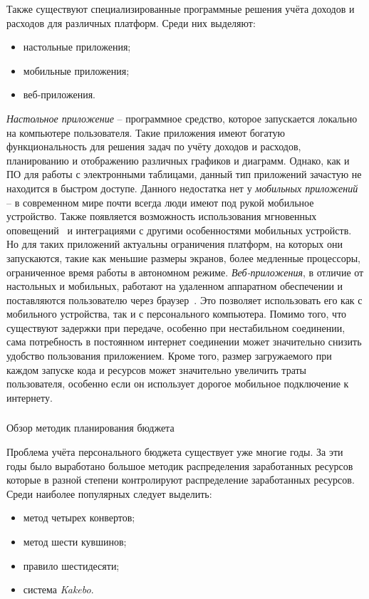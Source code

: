 Также существуют специализированные программные решения учёта доходов и расходов для различных платформ.
Среди них выделяют:
\begin{itemize}
    \item настольные приложения;
    \item мобильные приложения;
    \item веб-приложения.
\end{itemize}

\emph{Настольное приложение} -- программное средство, которое запускается локально на компьютере пользователя.
Такие приложения имеют богатую функциональность для решения задач по учёту доходов и расходов, планированию и отображению различных графиков и диаграмм.
Однако, как и ПО для работы с электронными таблицами, данный тип приложений зачастую не находится в быстром доступе.
Данного недостатка нет у \emph{мобильных приложений} -- в современном мире почти всегда люди имеют под рукой мобильное устройство.
Также появляется возможность использования мгновенных оповещений~\cite{desktop_mobile_differences} и интеграциями с другими особенностями мобильных устройств.
Но для таких приложений актуальны ограничения платформ, на которых они запускаются, такие как меньшие размеры экранов, более медленные процессоры, ограниченное время работы в автономном режиме.
\emph{Веб-приложения}, в отличие от настольных и мобильных, работают на удаленном аппаратном обеспечении и поставляются пользователю через браузер~\cite{web_based_vs_desktop}.
Это позволяет использовать его как с мобильного устройства, так и с персонального компьютера.
Помимо того, что существуют задержки при передаче, особенно при нестабильном соединении, сама потребность в постоянном интернет соединении может значительно снизить удобство пользования приложением.
Кроме того, размер загружаемого при каждом запуске кода и ресурсов может значительно увеличить траты пользователя, особенно если он использует дорогое мобильное подключение к интернету.

\subsubsection{} Обзор методик планирования бюджета
\label{sec:analysis:literature:planning}

Проблема учёта персонального бюджета существует уже многие годы.
За эти годы было выработано большое методик распределения заработанных ресурсов которые в разной степени контролируют распределение заработанных ресурсов.
Среди наиболее популярных следует выделить:
\begin{itemize}
    \item метод четырех конвертов;
    \item метод шести кувшинов;
    \item правило шестидесяти;
    \item система \emph{Kakebo}.
\end{itemize}

